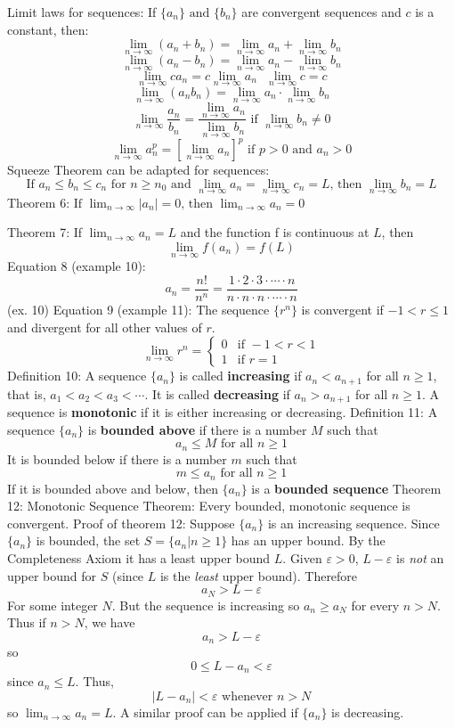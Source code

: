 \documentclass{article}
\begin{document}
    \begin{outline}
        \1 Limit laws for sequences: If \(\{a_n\}\text{ and }\{b_n\}\) are convergent sequences and $c$ is a constant, then: \[\lim_{n\to\infty}(a_n+b_n)=\lim_{n\to\infty}a_n+\lim_{n\to\infty}b_n\]\[\lim_{n\to\infty}(a_n-b_n)=\lim_{n\to\infty}a_n-\lim_{n\to\infty}b_n\]\[\lim_{n\to\infty}ca_n=c\lim_{n\to\infty}a_n\text{    }\lim_{n\to\infty}c=c\]\[\lim_{n\to\infty}(a_nb_n)=\lim_{n\to\infty}a_n\cdot\lim_{n\to\infty}b_n\]\[\lim_{n\to\infty}\dfrac{a_n}{b_n}=\dfrac{\lim_{n\to\infty}a_n}{\lim_{n\to\infty}b_n}\text{ if }\lim_{n\to\infty}b_n\neq0\]\[\lim_{n\to\infty}a_n^p=\left[\lim_{n\to\infty}a_n\right]^p\text{ if }p>0\text{ and }a_n>0\]
        \1 Squeeze Theorem can be adapted for sequences: \[\text{If }a_n\leq b_n\leq c_n\text{ for }n\geq n_0\text{ and }\lim_{n\to\infty}a_n=\lim_{n\to\infty}c_n=L\text{, then }\lim_{n\to\infty}b_n=L\]
        \1 Theorem 6: \(\text{If }\lim_{n\to\infty}|a_n|=0\text{, then }\lim_{n\to\infty}a_n=0\)
    \end{outline}\begin{multicols}{2}
        \begin{outline}
        \1 Theorem 7: If \(\lim_{n\to\infty}a_n=L\) and the function f is continuous at $L$, then \[\lim_{n\to\infty}f(a_n)=f(L)\]
        \1 Equation 8 (example 10): \[a_n=\dfrac{n!}{n^n}=\dfrac{1\cdot2\cdot3\cdot\cdots\cdot n}{n\cdot n\cdot n\cdot\cdots\cdot n}\] (ex. 10)
        \1 Equation 9 (example 11): The sequence \(\{r^n\}\) is convergent if \(-1<r\leq 1\) and divergent for all other values of $r$. \[\lim_{n\to\infty}r^n=\begin{cases} 0 & \mbox{if } -1<r<1 \\ 1 & \mbox{if }r=1 \end{cases}\]
        \1 Definition 10: A sequence \(\{a_n\}\) is called \textbf{increasing} if \(a_n<a_{n+1}\) for all \(n\geq 1\), that is, \(a_1<a_2<a_3<\cdots\). It is called \textbf{decreasing} if \(a_n>a_{n+1}\) for all \(n\geq 1\). A sequence is \textbf{monotonic} if it is either increasing or decreasing. 
        \1 Definition 11: A sequence \(\{a_n\}\) is \textbf{bounded above} if there is a number $M$ such that \[a_n\leq M\mbox{    for all }n\geq 1\] It is bounded below if there is a number $m$ such that \[m\leq a_n\text{    for all }n\geq 1\] If it is bounded above and below, then \(\{a_n\}\) is a \textbf{bounded sequence}
        \1 Theorem 12: Monotonic Sequence Theorem: Every bounded, monotonic sequence is convergent. 
        \1 Proof of theorem 12: Suppose \(\{a_n\}\) is an increasing sequence. Since \(\{a_n\}\) is bounded, the set \(S=\{a_n|n\geq 1\}\) has an upper bound. By the Completeness Axiom it has a least upper bound $L$. Given \(\varepsilon>0\), \(L-\varepsilon\) is \textit{not} an upper bound for $S$ (since $L$ is the \textit{least} upper bound). Therefore \[a_N>L-\varepsilon\] For some integer $N$. But the sequence is increasing so \(a_n\geq a_N\) for every \(n>N\). Thus if \(n>N\), we have \[a_n>L-\varepsilon\] so \[0\leq L-a_n<\varepsilon\] since \(a_n\leq L\). Thus, \[|L-a_n|<\varepsilon\text{     whenever }n>N \] so \(\lim_{n\to\infty}a_n=L\). A similar proof can be applied if \(\{a_n\}\) is decreasing. 
    \end{outline}

\end{multicols}
\end{document}
